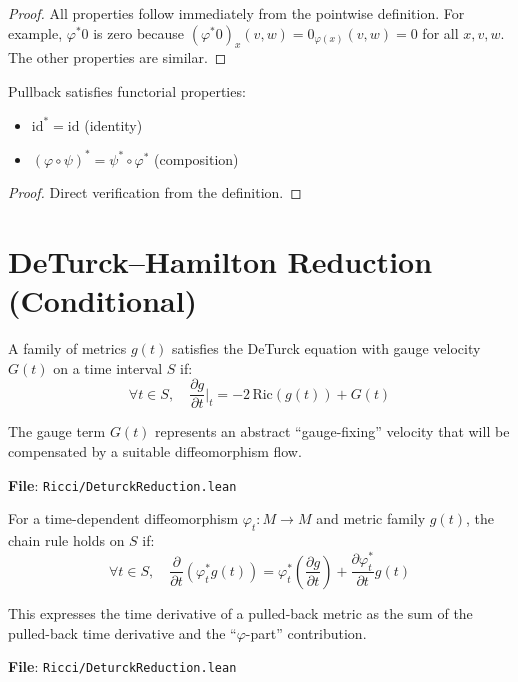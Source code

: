 \begin{proof}
\leanok
All properties follow immediately from the pointwise definition. For example, $\varphi^*0$ is zero because $(\varphi^*0)_x(v,w) = 0_{\varphi(x)}(v,w) = 0$ for all $x, v, w$. The other properties are similar.
\end{proof}

\begin{lemma}
\label{lem:pullback_functoriality}
\leanok
{}
Pullback satisfies functorial properties:
\begin{itemize}
\item $\mathrm{id}^* = \mathrm{id}$ (identity)
\item $(\varphi \circ \psi)^* = \psi^* \circ \varphi^*$ (composition)
\end{itemize}
\end{lemma}

\begin{proof}
\leanok
Direct verification from the definition.
\end{proof}

\section{DeTurck--Hamilton Reduction (Conditional)}

\begin{definition}
\label{def:deturckEqOnWithGauge}
A family of metrics $g(t)$ satisfies the DeTurck equation with gauge velocity $G(t)$ on a time interval $S$ if:
\[ \forall t \in S, \quad \frac{\partial g}{\partial t}\Big|_t = -2 \, \mathrm{Ric}(g(t)) + G(t) \]

The gauge term $G(t)$ represents an abstract ``gauge-fixing'' velocity that will be compensated by a suitable diffeomorphism flow.

\textbf{File}: \texttt{Ricci/DeturckReduction.lean}
\end{definition}

\begin{definition}
\label{def:pullbackChainRuleOn}
For a time-dependent diffeomorphism $\varphi_t : M \to M$ and metric family $g(t)$, the chain rule holds on $S$ if:
\[ \forall t \in S, \quad \frac{\partial}{\partial t}(\varphi_t^* g(t)) = \varphi_t^*\left(\frac{\partial g}{\partial t}\right) + \frac{\partial \varphi_t^*}{\partial t}g(t) \]

This expresses the time derivative of a pulled-back metric as the sum of the pulled-back time derivative and the ``$\varphi$-part'' contribution.

\textbf{File}: \texttt{Ricci/DeturckReduction.lean}
\end{definition}

